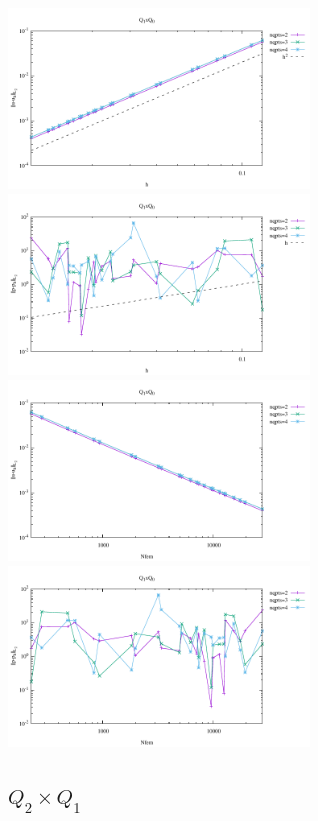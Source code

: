 \begin{center}
\includegraphics[width=8cm]{python_codes/fieldstone_120/results/Q1Q0-velocity-h.pdf}
\includegraphics[width=8cm]{python_codes/fieldstone_120/results/Q1Q0-pressure-h.pdf}\\
\includegraphics[width=8cm]{python_codes/fieldstone_120/results/Q1Q0-velocity-Nfem.pdf}
\includegraphics[width=8cm]{python_codes/fieldstone_120/results/Q1Q0-pressure-Nfem.pdf}
\end{center}

\subsection*{$Q_2\times Q_1$}

